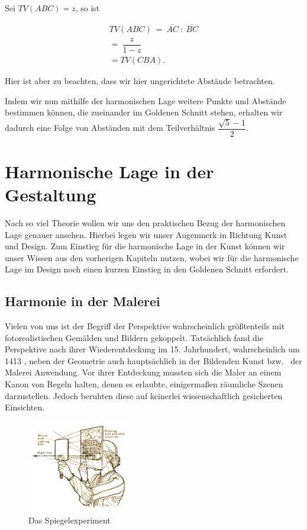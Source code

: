 \documentclass[12pt,a4paper]{article}
\begin{document}
Sei $TV(A B C) = z$, so ist

\begin{equation*}
\begin{split}
TV(A B C)~=~\overline{A C}~:~\overline{B C}\\
=~\dfrac{z}{1-z}~~~~~~\\
=TV(C B A).
\end{split}
\end{equation*}

Hier ist aber zu beachten, dass wir hier ungerichtete Abstände betrachten.

Indem wir nun mithilfe der harmonischen Lage weitere Punkte und Abstände bestimmen können, die zueinander im Goldenen Schnitt stehen, erhalten wir dadurch eine Folge von Abständen mit dem Teilverhältnis $\dfrac{\sqrt{5}-1}{2}$.

\newpage
\section{Harmonische Lage in der Gestaltung}

Nach so viel Theorie wollen wir uns den praktischen Bezug der harmonischen Lage genauer ansehen. Hierbei legen wir unser Augenmerk in Richtung Kunst und Design. Zum Einstieg für die harmonische Lage in der Kunst können wir unser Wissen aus den vorherigen Kapiteln nutzen, wobei wir für die harmonische Lage im Design noch einen kurzen Einstieg in den Goldenen Schnitt erfordert.

\subsection{Harmonie in der Malerei}

Vielen von uns ist der Begriff der Perspektive wahrscheinlich größtenteils mit fotorealistischen Gemälden und Bildern gekoppelt. Tatsächlich fand die Perspektive nach ihrer Wiederentdeckung im 15. Jahrhundert, wahrscheinlich um 1413 \citep[S.~27]{perspektive}, neben der Geometrie auch hauptsächlich in der Bildenden Kunst bzw.~ der Malerei Anwendung. Vor ihrer Entdeckung mussten sich die Maler an einem Kanon von Regeln halten, denen es erlaubte, einigermaßen räumliche Szenen darzustellen. Jedoch beruhten diese auf keinerlei wissenschaftlich gesicherten Einsichten.

\begin{figure}
\centering
\includegraphics[width=0.4\textwidth]{Bilder/Brunelleschi-Zentralperspektive.jpg}
\caption{Das  Spiegelexperiment}%
\label{fig:brunnelli1}
\end{figure}
\end{document}
